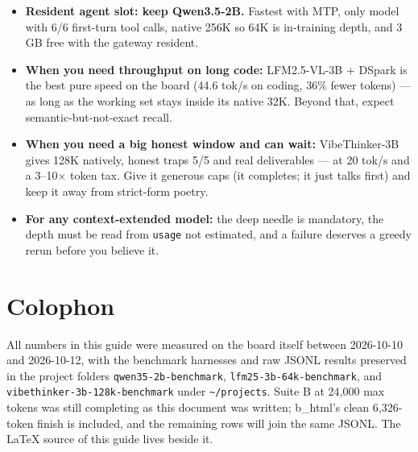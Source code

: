 \documentclass[11pt,a4paper]{article}
\begin{document}
\begin{itemize}[leftmargin=1.4em,itemsep=2pt]
  \item \textbf{Resident agent slot: keep Qwen3.5-2B.} Fastest with MTP,
        only model with 6/6 first-turn tool calls, native 256K so 64K is
        in-training depth, and 3\,GB free with the gateway resident.
  \item \textbf{When you need throughput on long code:} LFM2.5-VL-3B +
        DSpark is the best pure speed on the board (44.6 tok/s on coding,
        36\% fewer tokens) --- as long as the working set stays inside its
        native 32K. Beyond that, expect semantic-but-not-exact recall.
  \item \textbf{When you need a big honest window and can wait:}
        VibeThinker-3B gives 128K natively, honest traps 5/5 and real
        deliverables --- at 20 tok/s and a 3--10$\times$ token tax. Give it
        generous caps (it completes; it just talks first) and keep it away
        from strict-form poetry.
  \item \textbf{For any context-extended model:} the deep needle is
        mandatory, the depth must be read from \texttt{usage} not
        estimated, and a failure deserves a greedy rerun before you
        believe it.
\end{itemize}

\section*{Colophon}
All numbers in this guide were measured on the board itself between 2026-10-10
and 2026-10-12, with the benchmark harnesses and raw JSONL results preserved
in the project folders \texttt{qwen35-2b-benchmark},
\texttt{lfm25-3b-64k-benchmark}, and \texttt{vibethinker-3b-128k-benchmark}
under \texttt{\textasciitilde/projects}. Suite B at 24{,}000 max tokens was still completing as this document was written;
b\_html's clean 6{,}326-token finish is included, and the remaining rows
will join the same JSONL. The LaTeX source of this guide lives beside it.
\end{document}
